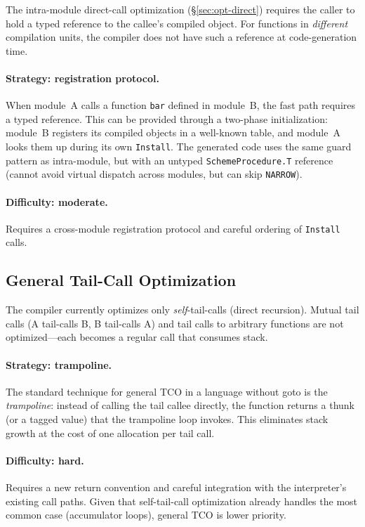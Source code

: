 \documentclass[12pt]{report}
\begin{document}
The intra-module direct-call optimization (\S\ref{sec:opt-direct})
requires the caller to hold a typed reference to the callee's
compiled object.  For functions in \emph{different} compilation
units, the compiler does not have such a reference at
code-generation time.

\paragraph{Strategy: registration protocol.}
When module~A calls a function \texttt{bar} defined in module~B,
the fast path requires a typed reference.  This can be provided
through a two-phase initialization: module~B registers its compiled
objects in a well-known table, and module~A looks them up during
its own \texttt{Install}.  The generated code uses the same guard
pattern as intra-module, but with an untyped
\texttt{SchemeProcedure.T} reference (cannot avoid virtual dispatch
across modules, but can skip \texttt{NARROW}).

\paragraph{Difficulty: moderate.}
Requires a cross-module registration protocol and careful ordering
of \texttt{Install} calls.

\subsection{General Tail-Call Optimization}
\label{sec:gap-tco}

The compiler currently optimizes only \emph{self}-tail-calls
(direct recursion).  Mutual tail calls (A tail-calls B, B
tail-calls A) and tail calls to arbitrary functions are not
optimized---each becomes a regular call that consumes stack.

\paragraph{Strategy: trampoline.}
The standard technique for general TCO in a language without
goto is the \emph{trampoline}: instead of calling the tail
callee directly, the function returns a thunk (or a tagged value)
that the trampoline loop invokes.  This eliminates stack growth
at the cost of one allocation per tail call.

\paragraph{Difficulty: hard.}
Requires a new return convention and careful integration with
the interpreter's existing call paths.  Given that self-tail-call
optimization already handles the most common case (accumulator
loops), general TCO is lower priority.
\end{document}
